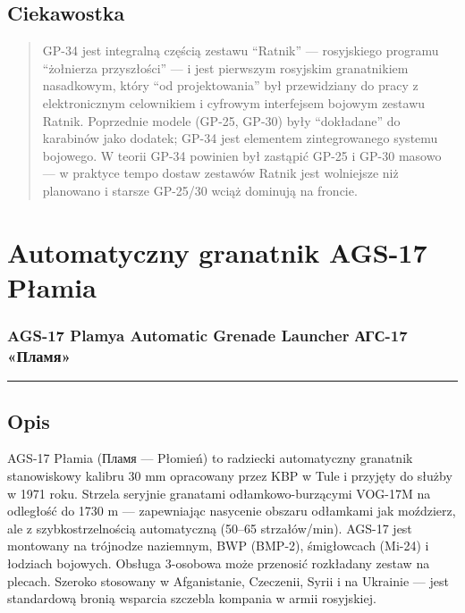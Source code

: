 \documentclass[12pt,openany,oneside]{book}
\begin{document}
\section{Ciekawostka}\label{ciekawostka-81}

\begin{quote}
GP-34 jest integralną częścią zestawu ``Ratnik'' --- rosyjskiego
programu ``żołnierza przyszłości'' --- i jest pierwszym rosyjskim
granatnikiem nasadkowym, który ``od projektowania'' był przewidziany do
pracy z elektronicznym celownikiem i cyfrowym interfejsem bojowym
zestawu Ratnik. Poprzednie modele (GP-25, GP-30) były ``dokładane'' do
karabinów jako dodatek; GP-34 jest elementem zintegrowanego systemu
bojowego. W teorii GP-34 powinien był zastąpić GP-25 i GP-30 masowo ---
w praktyce tempo dostaw zestawów Ratnik jest wolniejsze niż planowano i
starsze GP-25/30 wciąż dominują na froncie.
\end{quote}

\chapter{Automatyczny granatnik AGS-17
Płamia}\label{automatyczny-granatnik-ags-17-pux142amia}

\subsection{AGS-17 Plamya Automatic Grenade Launcher \textbar{} АГС-17
«Пламя»}\label{ags-17-plamya-automatic-grenade-launcher-ux430ux433ux441-17-ux43fux43bux430ux43cux44f}

\begin{center}\rule{0.5\linewidth}{0.5pt}\end{center}

\section{Opis}\label{opis-82}

AGS-17 Płamia (Пламя --- Płomień) to radziecki automatyczny granatnik
stanowiskowy kalibru 30 mm opracowany przez KBP w Tule i przyjęty do
służby w 1971 roku. Strzela seryjnie granatami odłamkowo-burzącymi
VOG-17M na odległość do 1730 m --- zapewniając nasycenie obszaru
odłamkami jak moździerz, ale z szybkostrzelnością automatyczną (50--65
strzałów/min). AGS-17 jest montowany na trójnodze naziemnym, BWP
(BMP-2), śmigłowcach (Mi-24) i łodziach bojowych. Obsługa 3-osobowa może
przenosić rozkładany zestaw na plecach. Szeroko stosowany w
Afganistanie, Czeczenii, Syrii i na Ukrainie --- jest standardową bronią
wsparcia szczebla kompania w armii rosyjskiej.
\end{document}
